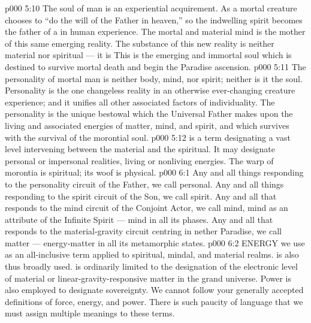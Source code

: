 \vs p000 5:10 \bibnobreakspace {} The soul of man is an experiential acquirement. As a mortal creature chooses to “do the will of the Father in heaven,” so the indwelling spirit becomes the father of a  in human experience. The mortal and material mind is the mother of this same emerging reality. The substance of this new reality is neither material nor spiritual --- it is  This is the emerging and immortal soul which is destined to survive mortal death and begin the Paradise ascension.
\vs p000 5:11 \pc {} The personality of mortal man is neither body, mind, nor spirit; neither is it the soul. Personality is the one changeless reality in an otherwise ever\hyp{}changing creature experience; and it unifies all other associated factors of individuality. The personality is the unique bestowal which the Universal Father makes upon the living and associated energies of matter, mind, and spirit, and which survives with the survival of the morontial soul.
\vs p000 5:12 \pc {} is a term designating a vast level intervening between the material and the spiritual. It may designate personal or impersonal realities, living or nonliving energies. The warp of morontia is spiritual; its woof is physical.
\vs p000 6:1 Any and all things responding to the personality circuit of the Father, we call personal. Any and all things responding to the spirit circuit of the Son, we call spirit. Any and all that responds to the mind circuit of the Conjoint Actor, we call mind, mind as an attribute of the Infinite Spirit --- mind in all its phases. Any and all that responds to the material\hyp{}gravity circuit centring in nether Paradise, we call matter --- energy\hyp{}matter in all its metamorphic states.
\vs p000 6:2 \pc ENERGY we use as an all\hyp{}inclusive term applied to spiritual, mindal, and material realms.  is also thus broadly used.  is ordinarily limited to the designation of the electronic level of material or linear\hyp{}gravity\hyp{}responsive matter in the grand universe. Power is also employed to designate sovereignty. We cannot follow your generally accepted definitions of force, energy, and power. There is such paucity of language that we must assign multiple meanings to these terms.
